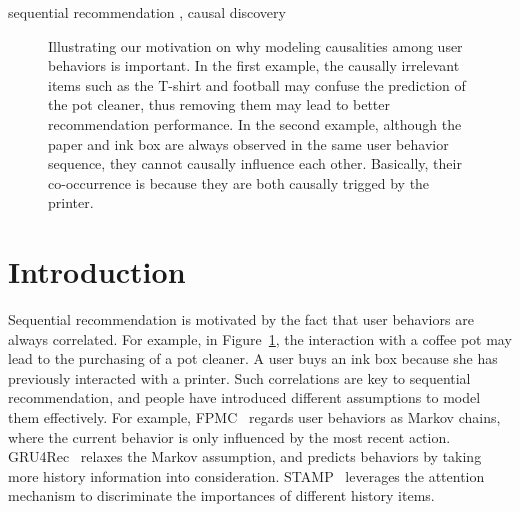 \documentclass[conference]{IEEEtran}
\theoremstyle{definition}
\theoremstyle{theorem}
\theoremstyle{proof}
\theoremstyle{remark}
\begin{document}
\begin{IEEEkeywords}
sequential recommendation , causal discovery
\end{IEEEkeywords}

\begin{figure}[t]
	\centering
	\setlength{\fboxrule}{0.pt}
	\setlength{\fboxsep}{0.pt}
	\vspace*{-0.1cm}
	\caption{
	{Illustrating our motivation on why modeling causalities among user behaviors is important.
		In the first example, the causally irrelevant items such as the T-shirt and football may confuse the prediction of the pot cleaner, thus removing them may lead to better recommendation performance.
		In the second example, although the paper and ink box are always observed in the same user behavior sequence, they cannot causally influence each other. 
        Basically, their co-occurrence is because they are both causally trigged by the printer.}
	}
	\label{intro}
	\vspace*{-0.2cm}
\end{figure}

\section{Introduction}\label{introduction}
Sequential recommendation is motivated by the fact that user behaviors are always correlated.
For example, in Figure~\ref{intro}, the interaction with a coffee pot may lead to the purchasing of a pot cleaner.
A user buys an ink box because she has previously interacted with a printer.
Such correlations are key to sequential recommendation, and people have introduced different assumptions to model them effectively.
For example, FPMC~\cite{rendle2010factorizing} regards user behaviors as Markov chains, where the current behavior is only influenced by the most recent action.
GRU4Rec~\cite{hidasi2015session} relaxes the Markov assumption, and predicts behaviors by taking more history information into consideration.
STAMP~\cite{liu2018stamp} leverages the attention mechanism to discriminate the importances of different history items.
\end{document}
